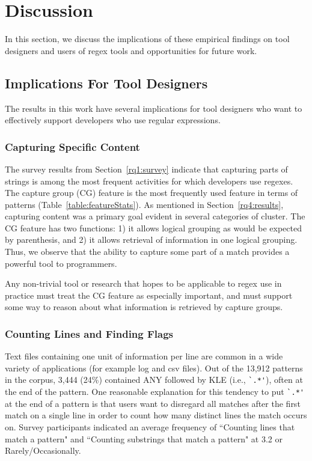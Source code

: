 \section{Discussion}
\label{sec:discussion}

In this section, we discuss the implications of these empirical findings on tool designers and users of regex tools and opportunities for future work.

\subsection{Implications For Tool Designers}
The results in this work have several implications for tool designers who want to effectively support developers who use regular expressions.

\subsubsection{Capturing Specific Content}
The survey results from Section~\ref{rq1:survey} indicate that capturing parts of strings is among the most frequent activities for which developers use regexes.
The capture group (CG) feature is the most frequently used feature in terms of patterns (Table~\ref{table:featureStats}).  As mentioned in Section~\ref{rq4:results}, capturing content was a primary goal evident in several categories of cluster.  The CG feature has two functions: 1) it allows logical grouping as would be expected by parenthesis, and 2) it allows retrieval of information in one logical grouping.  Thus, we observe that the ability to capture some part of a match provides a powerful tool to programmers.

Any non-trivial tool or research that hopes to be applicable to regex use in practice must treat the CG feature as especially important, and must support some way to reason about what information is retrieved by capture groups.

\subsubsection{Counting Lines and Finding Flags}
Text files containing one unit of information per line are common in a wide variety of applications (for example log and csv files).  Out of the 13,912 patterns in the corpus, 3,444 (24\%) contained ANY followed by KLE  (i.e., \verb!`.*'!), often at the end of the pattern.
One reasonable explanation for this tendency to put \verb!`.*'! at the end of a pattern is that users want to disregard all matches after the first match on a single line in order to count how many distinct lines the match occurs on.  Survey participants indicated an average frequency of ``Counting lines that match a pattern" and ``Counting substrings that match a pattern" at 3.2 or Rarely/Occasionally.

